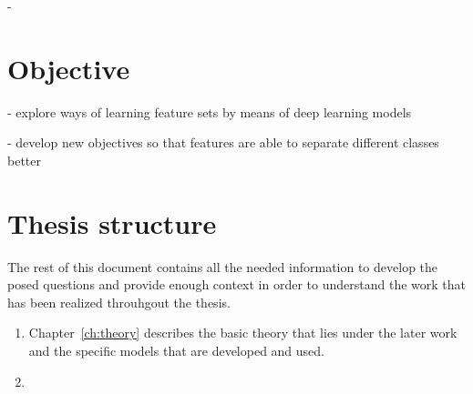 - 

\section{Objective}

- explore ways of learning feature sets by means of deep learning models

- develop new objectives so that features are able to separate different classes better

\section{Thesis structure}

The rest of this document contains all the needed information to develop the posed questions and provide enough context in order to understand the work that has been realized throuhgout the thesis.

\begin{enumerate}
    \item Chapter~\ref{ch:theory} describes the basic theory that lies under the later work and the specific models that are developed and used.
    \item {}
\end{enumerate}